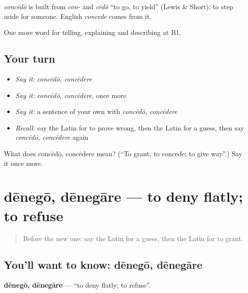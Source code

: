 \begin{cousinweb}
\emph{concēdō} is built from \emph{con-} and \emph{cēdō} \textquotedblleft{}to go, to yield\textquotedblright{} (Lewis \& Short): to step aside for someone. English \emph{concede} comes from it.
\end{cousinweb}

\begin{grammarlens}[title={What you've built}]
One more word for telling, explaining and describing at B1.
\end{grammarlens}

\subsection*{Your turn}
\begin{itemize}
\raggedright
  \item \emph{Say it:} \emph{concēdō, concēdere}
  \item \emph{Say it:} \emph{concēdō, concēdere}, once more
  \item \emph{Say it:} a sentence of your own with \emph{concēdō, concēdere}
  \item \emph{Recall:} say the Latin for to prove wrong, then the Latin for a guess, then say \emph{concēdō, concēdere} again
\end{itemize}

\begin{tcolorbox}[breakable,colback=teal!4,colframe=teal!35!black,title={Before you move on}]
What does concēdō, concēdere mean? (\textquotedblleft{}To grant, to concede; to give way\textquotedblright{}.) Say it once more.
\end{tcolorbox}
\section[dēnegō, dēnegāre]{dēnegō, dēnegāre — to deny flatly; to refuse}

\label{lesson:LA-C363-denego}



\begin{quote}
Before the new one: say the Latin for a guess, then the Latin for to grant.
\end{quote}

\subsection*{You'll want to know: dēnegō, dēnegāre}
\textbf{dēnegō, dēnegāre} — \textquotedblleft{}to deny flatly; to refuse\textquotedblright{}.

